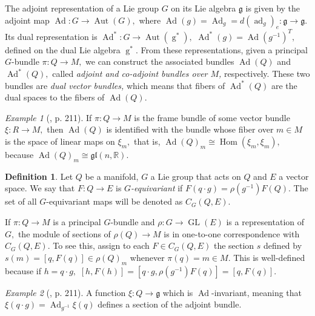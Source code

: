 \documentclass[12pt, letterpaper, reqno]{amsart}
\theoremstyle{definition}
\newtheorem{df}{Definition}
\theoremstyle{plain}
\theoremstyle{remark}
\newtheorem{ex}{Example}
\begin{document}
The adjoint representation of a Lie group $ G $ on its Lie algebra $ \mathfrak{g} $ is given by the adjoint map $ \operatorname{Ad} : G \rightarrow \operatorname{Aut}(G),  $ where $ \operatorname{Ad} (g)= \operatorname{Ad}_g= d( \operatorname{ad}_g )_e : \mathfrak{g}\rightarrow \mathfrak{g}. $ Its dual representation is $ \operatorname{Ad}^*: G \rightarrow \operatorname{Aut} ( \operatorname{g}^* ), $ $ \operatorname{Ad}^*(g)= \operatorname{Ad} (g^{-1})^T, $ defined on the dual Lie algebra $ \operatorname{g}^*. $ From these representations, given a principal $ G $-bundle $ \pi: Q \rightarrow M, $ we can construct the associated bundles $ \operatorname{Ad}(Q) $ and $ \operatorname{Ad}^*(Q), $ called \textit{adjoint and co-adjoint bundles over $ M $, } respectively. These two bundles are \textit{dual vector bundles,} which means that fibers of $  \operatorname{Ad}^*(Q)$ are the dual spaces to the fibers of $ \operatorname{Ad} (Q). $ 

\begin{ex}[\cite{montgomery2002tour}, p. 211]
	If $ \pi:Q \rightarrow M $ is the frame bundle of some vector bundle $ \xi: R \rightarrow M, $ then $ \operatorname{Ad}(Q) $ is identified with the bundle whose fiber over $ m\in M $ is the space of linear maps on $ \xi_m, $ that is, $ \operatorname{Ad} (Q)_m \cong \operatorname{Hom}(\xi_m,\xi_m),  $ because $ \operatorname{Ad}(Q)_m\cong \mathfrak{gl}(n, \mathbb{R}).  $ 
\end{ex}
\begin{df}
	Let $ Q $ be a manifold, $ G $ a Lie group that acts on $ Q $ and $ E $ a vector space. We say that $ F: Q \rightarrow E $ is \textit{$G$-equivariant} if $ F(q\cdot g) = \rho(g^{-1})F(Q). $ The set of all $ G $-equivariant maps will be denoted as $ C_G(Q,E). $  
\end{df}
If $ \pi: Q \rightarrow M $ is a principal $ G $-bundle and $ \rho: G \rightarrow \operatorname{GL} (E) $ is a representation  of $ G, $ the module of sections of $ \rho(Q) \rightarrow M $ is in one-to-one correspondence with $ C_G(Q,E). $ To see this, assign to each $ F\in C_G(Q,E) $ the section $s $ defined by $s(m)=[q, F(q)]\in \rho(Q)_m $ whenever $ \pi(q)=m\in M. $  This is well-defined because if $ h= q\cdot g, $ $ [h,F(h)]=[q\cdot g, \rho(g^{-1})F(q)]=[q,F(q)]$.  

\begin{ex}[\cite{montgomery2002tour}, p. 211]
	A function $ \xi: Q \rightarrow \mathfrak{g}  $ which is $ \operatorname{Ad}  $-invariant, meaning that $ \xi(q\cdot g)= \operatorname{Ad}_{g^{-1}}\xi(q) $ defines a section of the adjoint bundle. 
\end{ex}
\end{document}
